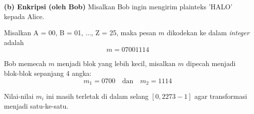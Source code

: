 \documentclass{article}
\begin{document}

\textbf{(b) Enkripsi (oleh Bob)}\newline
Misalkan Bob ingin mengirim plainteks 'HALO' kepada Alice.

Misalkan A = 00, B = 01, ..., Z = 25, maka pesan $m$ dikodekan ke dalam \textit{integer} adalah
\[ m = 07001114 \]

Bob memecah $m$ menjadi blok yang lebih kecil, misalkan $m$ dipecah menjadi blok-blok sepanjang 4 angka:
\[ m_1 = 0700 \quad \text{dan} \quad m_2 = 1114 \]

Nilai-nilai $m_i$ ini masih terletak di dalam selang $[0, 2273 - 1]$ agar transformasi menjadi satu-ke-satu.
\end{document}
